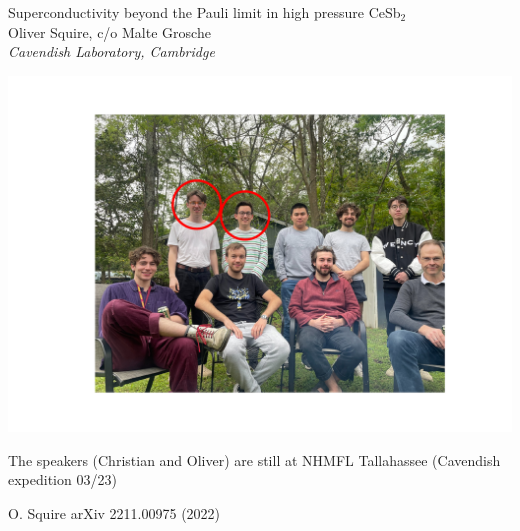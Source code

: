 \begin{frame}[label=TitlePage]
\begin{center}
\textcolor[rgb]{0.2,0.2,0.7}{\small Superconductivity beyond the Pauli limit in high pressure CeSb$_2$} \\
\vspace{0.5em}
{\footnotesize Oliver Squire, c/o Malte Grosche} \\
{\footnotesize \em Cavendish Laboratory, Cambridge} \\
\vspace{0.1em}
\end{center}
\vspace{0.0em}
\centerline{ \includegraphics[width=0.75\columnwidth]{GroupPhoto}}

\centerline{\scriptsize The speakers (Christian and Oliver) are still at NHMFL Tallahassee (Cavendish expedition 03/23)}

\vspace{0em}
\centerline{\makebox[\linewidth]{\rule{0.85\textwidth}{0.4pt}}}

\centerline{\scriptsize O. Squire arXiv 2211.00975 (2022)}

\end{frame}

